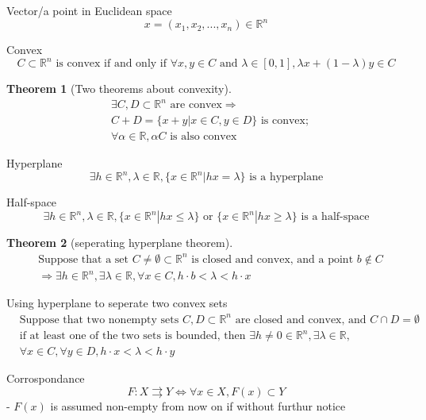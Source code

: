 \documentclass{article}
\newtheorem{theorem}{Theorem}
\begin{document}
Vector/a point in Euclidean space
$$x=(x_{1},x_{2},...,x_{n})\in \mathbb{R}^{n}$$

Convex
$$C\subset \mathbb{R}^{n} \text{ is convex if and only if } \forall x,y \in C \text{ and } \lambda\in[0,1],\lambda x+ (1-\lambda)y\in C$$

\begin{theorem}[Two theorems about convexity]
\begin{align}
&\exists C,D \subset \mathbb{R}^{n} \text{ are convex} \Rightarrow
\\&C+D=\{x+y|x\in C, y\in D\} \text{ is convex};
\\&\forall \alpha \in \mathbb{R}, \alpha C \text{ is also convex}
\end{align}
\end{theorem}

Hyperplane
$$\exists h \in \mathbb{R}^{n},\lambda\in \mathbb{R},\{x\in \mathbb{R}^{n}|hx=\lambda \} \text{ is a hyperplane}$$

Half-space
$$\exists h \in \mathbb{R}^{n},\lambda\in \mathbb{R},\{x\in \mathbb{R}^{n}|hx \leqslant \lambda \} \text{ or } \{x\in \mathbb{R}^{n}|hx \geqslant \lambda \}\text{ is a half-space}$$

\begin{theorem}[seperating hyperplane theorem]
\begin{align}
&\text{Suppose that a set } C \neq \emptyset \subset \mathbb{R}^{n} \text{ is closed and convex, and a point } b \notin C
\\& \Rightarrow \exists h \in \mathbb{R}^{n}, \exists \lambda \in \mathbb{R}, \forall x \in C, h\cdot b < \lambda<h\cdot x
\end{align}
\end{theorem}

Using hyperplane to seperate two convex sets
\begin{align}
&\text{Suppose that two nonempty sets }C,D \subset \mathbb{R}^{n} \text{ are closed and convex, and } C\cap D=\emptyset
\\&\text{if at least one of the two sets is bounded, then } \exists h \neq0 \in \mathbb{R}^{n}, \exists \lambda \in \mathbb{R},
\\& \forall x \in C,\forall y \in D, h \cdot x < \lambda<h \cdot y
\end{align}

Corrospondance
$$F: X \rightrightarrows Y \iff \forall x \in X, F(x)\subset Y$$
- $F(x)$ is assumed non-empty from now on if without furthur notice
\end{document}
